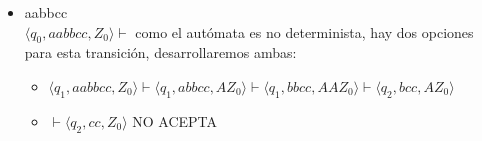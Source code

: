 \documentclass{article}
\begin{document}
\begin{enumerate}
{\begin{enumerate}
{\begin{itemize}
{        		\begin{itemize}
        			\item {
        			$\langle q_1, aabbccc, Z_0 \rangle \vdash \langle q_1, abbccc, AZ_0 \rangle \vdash \langle q_1, bbccc, AAZ_0 \rangle \vdash  \langle q_2, bccc, AZ_0 \rangle$ 
        			}
        			\item {
        			$\vdash \langle q_2, ccc, \epsilon Z_0 \rangle$  NO ACEPTA\\
        			}
        		\end{itemize}
        	
        		\begin{itemize}
        			\item {
        				$\langle q_6, aabbccc, Z_0 \rangle \vdash \langle q_6, abbccc, Z_0 \rangle \vdash \langle q_6, bbccc, Z_0 \rangle \vdash  \langle q_6, bccc, BZ_0 \rangle \vdash  \langle q_6, ccc, BBZ_0 \rangle \vdash \langle q_7, cc, BZ_0 \rangle \vdash \langle q_7, c, Z_0 \rangle$ 
        			}
        			\item {
        			$\vdash \langle q_9, \epsilon, \epsilon Z_0 \rangle$ ACEPTA porque $q_9 \in F$\\
        			}
        		
        			Como un cómputo acepto la cadena, entonces el autómata la acepta.\\
        		\end{itemize}
        		
        		}
        		\item {
        		aabbcc\\
        		
        		$\langle q_0, aabbcc, Z_0 \rangle \vdash$ como el autómata es no determinista, hay dos opciones para esta transición, desarrollaremos ambas:\\
        		
        		\begin{itemize}
        			\item {
        				$\langle q_1, aabbcc, Z_0 \rangle \vdash \langle q_1, abbcc, AZ_0 \rangle \vdash \langle q_1, bbcc, AAZ_0 \rangle \vdash \langle q_2, bcc, AZ_0 \rangle $ 
        			}
        			\item {
        				$\vdash \langle q_2, cc, Z_0 \rangle$  NO ACEPTA\\
        			}
        		\end{itemize}
        		
}
\end{itemize}}
\end{enumerate}}
\end{enumerate}
\end{document}

